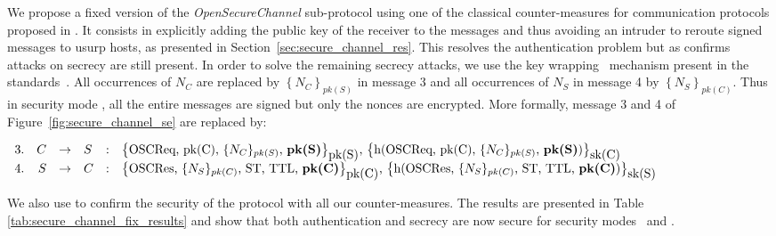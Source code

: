 We propose a fixed version of the {\em OpenSecureChannel} sub-protocol using
one of the classical counter-measures for communication protocols proposed in
\cite{AN96}.
It consists in explicitly adding the public key of the receiver to the
messages and thus avoiding an intruder to reroute signed messages to
usurp hosts, as presented in Section~\ref{sec:secure_channel_res}. This
resolves the authentication problem but as \proverif{} confirms
attacks on secrecy are still present. In order to solve the remaining
secrecy attacks, we use the key wrapping~\cite{FLS11} mechanism
present in the \opcua{}
standards~\cite{MLD09,opcua_part2,opcua_part4,opcua_part6}.
All occurrences of
$N_{C}$ are replaced by $\left\{\mbox{$N_{C}$}\right\}_{pk(S)}$ in
message 3 and all occurrences of $N_{S}$ in message 4 by
$\left\{\mbox{$N_{S}$}\right\}_{pk(C)}$.  Thus in security mode \sms, all the
entire messages are signed but only the nonces are encrypted.
More formally, message 3 and 4 of Figure~\ref{fig:secure_channel_se}
are replaced by:
\begin{flushleft}
\arraycolsep=1.4pt
{\scriptsize
    $\begin{array}{lrllll}
        3. & C & \rightarrow & S & : & \text{\sm{\oscreq, pk(C), $\{N_{C}\}_{pk(S)}$, {\bf pk(S)}}{pk(S)}{sk(C)}}\\
        4. & S & \rightarrow & C & : & \text{\sm{\oscres, $\{N_{S}\}_{pk(C)}$, ST, TTL, {\bf pk(C)}}{pk(C)}{sk(S)}}\\
    \end{array}$
}
\end{flushleft}

 We also use \proverif to confirm the security of the protocol with all
 our counter-measures.  The results are presented in Table
 \ref{tab:secure_channel_fix_results} and show that both
 authentication and secrecy are now secure for security modes \sms~and
 \smse. %

